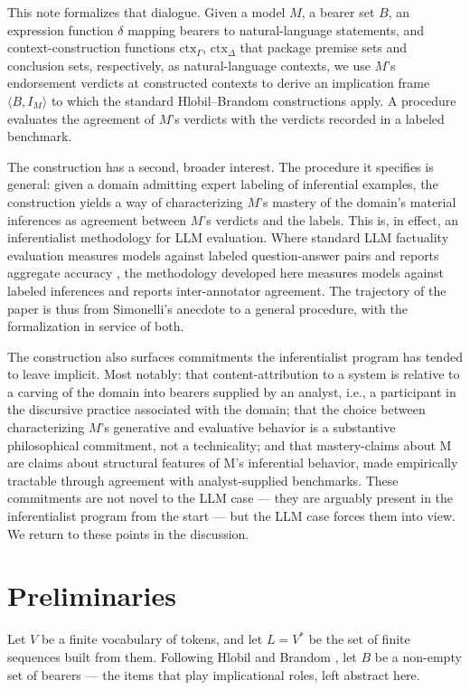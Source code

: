 \documentclass[11pt]{article}
\begin{document}
This note formalizes that dialogue. Given a model $M$, a bearer set $B$, an expression function $\delta$ mapping bearers to natural-language statements, and context-construction functions $\mathrm{ctx}_\Gamma$, $\mathrm{ctx}_\Delta$ that package premise sets and conclusion sets, respectively, as natural-language contexts, we use $M$'s endorsement verdicts at constructed contexts to derive an implication frame $\langle B, I_M \rangle$ to which the standard Hlobil--Brandom constructions apply. A procedure evaluates the agreement of $M$'s verdicts with the verdicts recorded in a labeled benchmark.

The construction has a second, broader interest. The procedure it specifies is general: given a domain admitting expert labeling of inferential examples, the construction yields a way of characterizing $M$'s mastery of the domain's material inferences as agreement between $M$'s verdicts and the labels. This is, in effect, an inferentialist methodology for LLM evaluation. Where standard LLM factuality evaluation measures models against labeled question-answer pairs and reports aggregate accuracy \cite{wei2024,bang2025}, the methodology developed here measures models against labeled inferences and reports inter-annotator agreement. The trajectory of the paper is thus from Simonelli's anecdote to a general procedure, with the formalization in service of both.

The construction also surfaces commitments the inferentialist program has tended to leave implicit. Most notably: that content-attribution to a system is relative to a carving of the domain into bearers supplied by an analyst, i.e., a participant in the discursive practice associated with the domain; that the choice between characterizing $M$'s generative and evaluative behavior is a substantive philosophical commitment, not a technicality; and that mastery-claims about M are claims about structural features of M's inferential behavior, made empirically tractable through agreement with analyst-supplied benchmarks. These commitments are not novel to the LLM case --- they are arguably present in the inferentialist program from the start --- but the LLM case forces them into view. We return to these points in the discussion.

\section{Preliminaries}

Let $V$ be a finite vocabulary of tokens, and let $L = V^*$ be the set of finite sequences built from them. Following Hlobil and Brandom \cite[Def.~61]{hlobil2025}, let $B$ be a non-empty set of bearers --- the items that play implicational roles, left abstract here.
\end{document}
